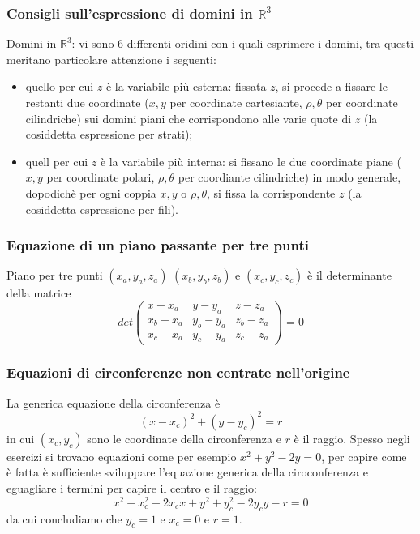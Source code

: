 \subsubsection{Consigli sull'espressione di domini in $\mathbb{R}^3$}
Domini in $\mathbb{R}^3$: vi sono 6 differenti oridini con i quali esprimere i domini, tra questi meritano particolare attenzione i seguenti:
\begin{itemize}
    \item quello per cui $z$ è la variabile più esterna: fissata $z$, si procede a fissare le restanti due coordinate ($x,y$ per coordinate cartesiante, $\rho, \theta$ per coordinate cilindriche) sui domini piani che corrispondono alle varie quote di $z$ (la cosiddetta espressione per strati);
    \item quell per cui $z$ è la variabile più interna: si fissano le due coordinate piane ($x,y$ per coordinate polari, $\rho, \theta$ per coordiante cilindriche) in modo generale, dopodichè per ogni coppia $x,y$ o $\rho, \theta$, si fissa la corrispondente $z$ (la cosiddetta espressione per fili).
\end{itemize}
\subsubsection{Equazione di un piano passante per tre punti}
Piano per tre punti $(x_a, y_a, z_a)$ $(x_b, y_b, z_b)$ e $(x_c, y_c, z_c)$ è il determinante della matrice 
\[
    det\left(\begin{matrix}
        x-x_a & y-y_a & z-z_a\\
        x_b-x_a & y_b-y_a & z_b-z_a\\
        x_c-x_a & y_c - y_a & z_c -z_a 
    \end{matrix}\right) = 0
\]
\subsubsection{Equazioni di circonferenze non centrate nell'origine}
La generica equazione della circonferenza è
\[
    (x-x_c)^2 + (y-y_c)^2 = r
\]
in cui $(x_c, y_c)$ sono le coordinate della circonferenza e $r$ è il raggio.\newline
\newline
Spesso negli esercizi si trovano equazioni come per esempio $x^2 + y^2 -2y = 0$, per capire come è fatta è sufficiente sviluppare l'equazione generica della ciroconferenza e eguagliare i termini per capire il centro e il raggio:
\[
    x^2 + x_c^2 -2x_cx + y^2 + y_c^2 - 2y_cy - r = 0
\]
da cui concludiamo che $y_c = 1$ e $x_c = 0$ e $r=1$.
